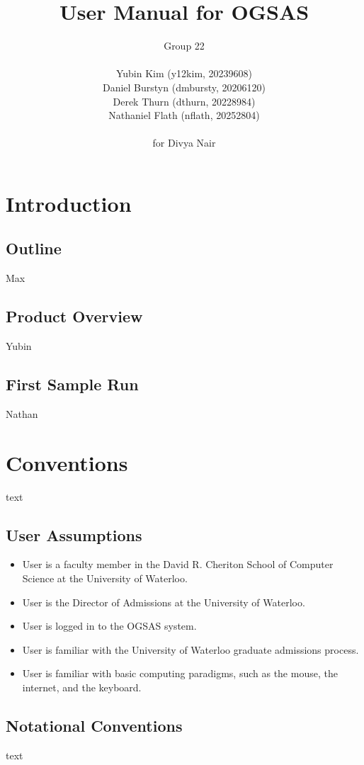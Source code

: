 \documentclass[titlepage]{article}
\title{User Manual for OGSAS}
\author{Group 22 \\
\\
Yubin Kim (y12kim, 20239608) \\
Daniel Burstyn (dmbursty, 20206120) \\
Derek Thurn (dthurn, 20228984) \\
Nathaniel Flath (nflath, 20252804)
\\
\\for Divya Nair}
\begin{document}
\maketitle
\newpage
\tableofcontents
\newpage


\section{Introduction}
\subsection{Outline}
Max
\subsection{Product Overview}
Yubin
\subsection{First Sample Run}
Nathan


\section{Conventions}
text
\subsection{User Assumptions}
\begin{itemize}
\item User is a faculty member in the David R. Cheriton School of Computer
  Science at the University of Waterloo.
\item User is the Director of Admissions at the University of Waterloo.
\item User is logged in to the OGSAS system.
\item User is familiar with the University of Waterloo graduate admissions
  process.
\item User is familiar with basic computing paradigms, such as the mouse, the
  internet, and the keyboard.
\end{itemize}

\subsection{Notational Conventions}
text
\end{document}
